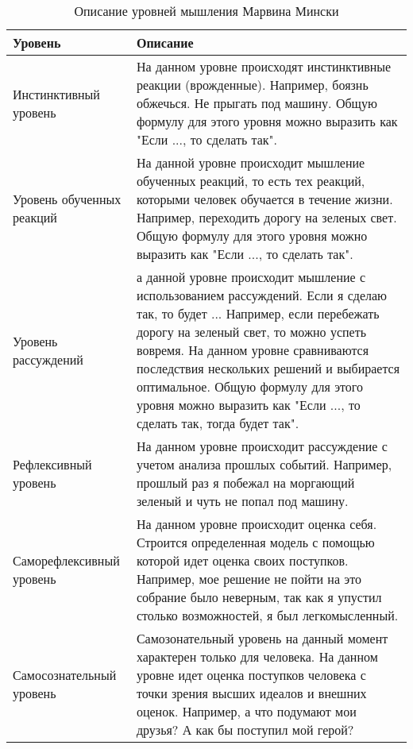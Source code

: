 \begin{table} [htbp]
  \centering
  \parbox{15cm}{\caption{Описание уровней мышления Марвина Мински}\label{ThinkingLevelDescription}}
  \begin{tabular}{| p{5cm} | p{11cm} |}
  \hline
  \hline
Уровень & Описание \\
  \hline
    \hline

Инстинктивный уровень	& На данном уровне происходят инстинктивные реакции (врожденные). Например, боязнь обжечься. Не прыгать под машину. Общую формулу для этого уровня можно выразить как "Если ..., то сделать так". \\
  \hline

Уровень обученных реакций  & На  данной уровне происходит мышление обученных реакций, то есть тех реакций, которыми человек обучается в течение жизни. Например, переходить дорогу на зеленых свет. Общую формулу для этого уровня можно выразить как "Если ..., то сделать так". \\
  \hline

Уровень рассуждений & а  данной уровне происходит мышление с использованием рассуждений. Если я сделаю так, то будет ... Например, если перебежать дорогу на зеленый свет, то можно успеть вовремя. На данном уровне сравниваются последствия нескольких решений и выбирается оптимальное. Общую формулу для этого уровня можно выразить как "Если ..., то сделать так, тогда будет так". \\
  \hline

Рефлексивный уровень  & На данном уровне происходит рассуждение с учетом анализа прошлых событий. Например, прошлый раз я побежал на моргающий зеленый и чуть не попал под машину. \\

  \hline
  Саморефлексивный уровень & На данном уровне происходит оценка себя. Строится определенная модель с помощью которой идет оценка своих поступков. Например, мое решение не пойти на это собрание было неверным, так как я упустил столько возможностей, я был легкомысленный. \\
  \hline
  Самосознательный уровень & Самозонательный уровень на данный момент характерен только для человека. На данном уровне идет оценка поступков человека с точки зрения высших идеалов и внешних оценок. Например, а что подумают мои друзья? А как бы поступил мой герой? \\
  \hline
  
  \end{tabular}
\end{table}

